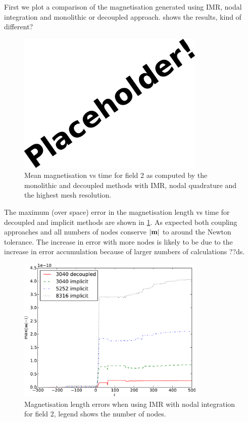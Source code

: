 First we plot a comparison of the magnetisation generated using IMR, nodal integration and monolithic or decoupled approach.
 shows the results, kind of different?
\begin{figure}
  \centering
  \includegraphics[width=0.8\textwidth]{images/placeholder}
  \caption{Mean magnetisation vs time for field 2 as computed by the monolithic and decoupled methods with IMR, nodal quadrature and the highest mesh resolution.}
  \label{fig:mumag4-implicit-decoupled}
\end{figure}


The maximum (over space) error in the magnetisation length vs time for decoupled and implicit methods are shown in \cref{fig:mumag4-implicit-decoupled}.
As expected both coupling approaches and all numbers of nodes conserve $\left|{\boldsymbol{\mathrm{m}}} \right|$ to around the Newton tolerance.
The increase in error with more nodes is likely to be due to the increase in error accumulation because of larger numbers of calculations ??ds.
\begin{figure}
  \centering
  \includegraphics[width=0.8\textwidth]{plots/mumag4_ml/mlengtherrormaxesvstimes.pdf}
  \caption{Magnetisation length errors when using IMR with nodal integration for field 2, legend shows the number of nodes.}
  \label{fig:imr-conservation}
\end{figure}



